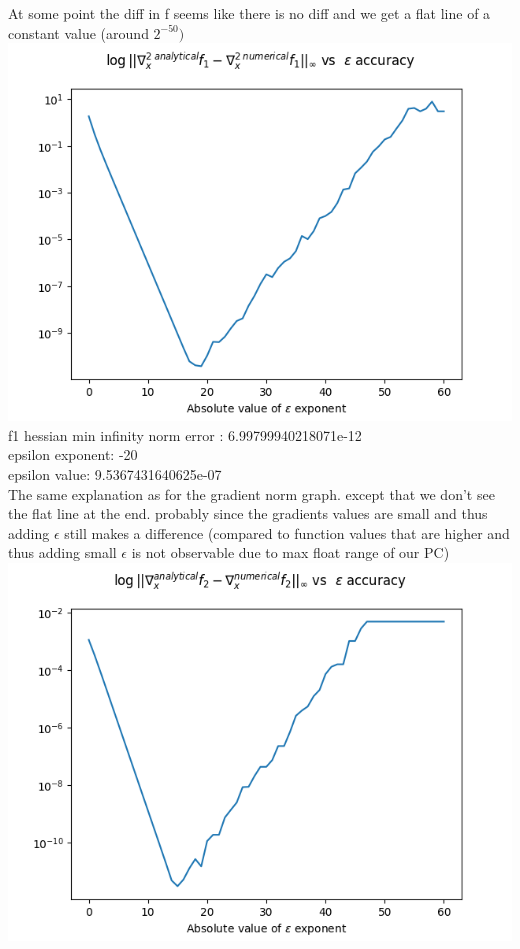 \documentclass[12pt]{article}
\begin{document}
At some point the diff in f seems like there is no diff and we get a flat line of a constant value (around $2^{-50})$\\
\includegraphics[scale=0.7]{f1_hessian_plot}\\
f1 hessian min infinity norm error : 6.99799940218071e-12\\
epsilon exponent: -20\\
epsilon value: 9.5367431640625e-07\\
The same explanation as for the gradient norm graph. except that we don't see the flat line at the end. probably since the gradients values are small and thus adding $\epsilon$ still makes a difference (compared to function values that are higher and thus adding small $\epsilon$ is not observable due to max float range of our PC)\\
\includegraphics[scale=0.7]{f2_grad_plot}\\
\end{document}
